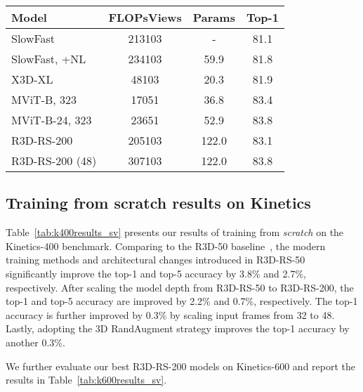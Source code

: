 \documentclass{article} \usepackage{iclr2021_conference,times}
\begin{document}
\setlength{\tabcolsep}{4pt}
\begin{table*}[b]
\centering
\begin{tabular}{l | c | c|   c}
  \toprule
  Model  & FLOPsViews & Params  & Top-1  \\
  \midrule
  SlowFast~\cite{Feichtenhofer2019SlowFastNF} &  213103 & - & 81.1  \\
  SlowFast, +NL~\cite{Feichtenhofer2019SlowFastNF} &  234103 & 59.9 & 81.8  \\
  X3D-XL~\cite{feichtenhofer2020x3d} & 48103 & 20.3 & 81.9 \\
  MViT-B, 323~\cite{Fan2021MultiscaleVT} &  17051& 36.8 & 83.4 \\
  MViT-B-24, 323~\cite{Fan2021MultiscaleVT} & 23651& 52.9 &  83.8 \\
  \midrule
  R3D-RS-200 &  205103 & 122.0 &  83.1 \\
  R3D-RS-200 (48) &  307103 & 122.0 & 83.8 \\
  \bottomrule
\end{tabular}
\vspace{1mm}
\caption{\small{
\textbf{Comparisons of models trained from \textit{scratch} on Kinetics-600.} Inference ``Views'' is presented in . ``48'': scaling up input \#frames from 32 to 48. SlowFast networks adopt the 168 setting with a R101 backbone.}}
\label{tab:k600results_sv} 
\end{table*}


\subsection{Training from scratch results on Kinetics}


Table~\ref{tab:k400results_sv} presents our results of training from \textit{scratch} on the Kinetics-400 benchmark. Comparing to the R3D-50 baseline~\cite{bello2021revisiting}, the modern training methods and architectural changes introduced in R3D-RS-50 significantly improve the top-1 and top-5 accuracy by 3.8\% and 2.7\%, respectively. After scaling the model depth from R3D-RS-50 to R3D-RS-200, the top-1 and top-5 accuracy are improved by 2.2\% and 0.7\%, respectively. The top-1 accuracy is further improved by 0.3\% by scaling input frames from 32 to 48. Lastly, adopting the 3D RandAugment strategy improves the top-1 accuracy by another 0.3\%.

We further evaluate our best R3D-RS-200 models on Kinetics-600 and report the results in Table~\ref{tab:k600results_sv}.
\end{document}
